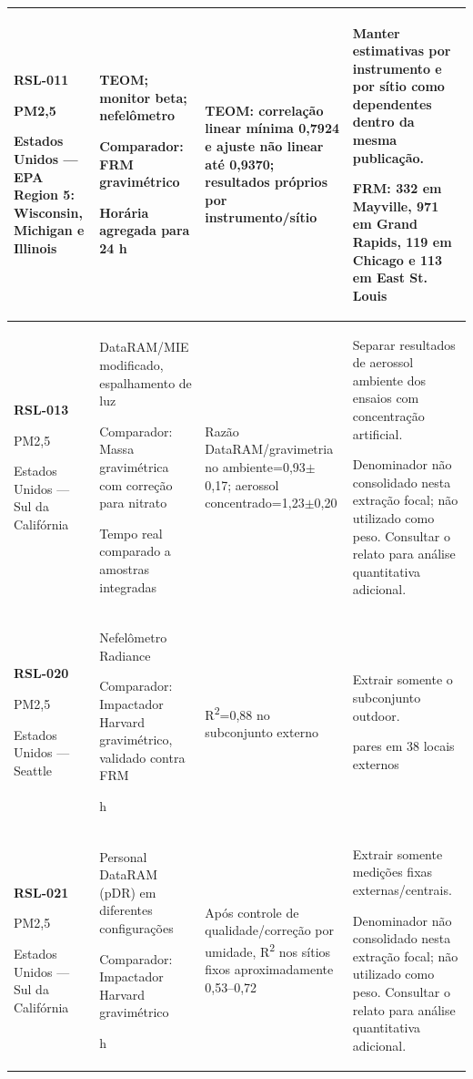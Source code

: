 \begin{longtable}{|P{0.18\textwidth}|P{0.25\textwidth}|P{0.28\textwidth}|P{\arrayrulewidth\relax}|}
\textbf{RSL-011}\par\textcite{rsl011}\par PM2,5\par Estados Unidos --- EPA Region 5: Wisconsin, Michigan e Illinois & TEOM; monitor beta; nefelômetro\par\medskip Comparador: FRM gravimétrico\par\medskip Horária agregada para 24 h & TEOM: correlação linear mínima 0,7924 e ajuste não linear até 0,9370; resultados próprios por instrumento/sítio & Manter estimativas por instrumento e por sítio como dependentes dentro da mesma publicação.\par\medskip FRM: 332 em Mayville, 971 em Grand Rapids, 119 em Chicago e 113 em East St. Louis\\\hline
\textbf{RSL-013}\par\textcite{rsl013}\par PM2,5\par Estados Unidos --- Sul da Califórnia & DataRAM/MIE modificado, espalhamento de luz\par\medskip Comparador: Massa gravimétrica com correção para nitrato\par\medskip Tempo real comparado a amostras integradas & Razão DataRAM/gravimetria no ambiente=0,93\ensuremath{\pm}0,17; aerossol concentrado=1,23\ensuremath{\pm}0,20 & Separar resultados de aerossol ambiente dos ensaios com concentração artificial.\par\medskip Denominador não consolidado nesta extração focal; não utilizado como peso. Consultar o relato para análise quantitativa adicional.\\\hline
\textbf{RSL-020}\par\textcite{rsl020}\par PM2,5\par Estados Unidos --- Seattle & Nefelômetro Radiance\par\medskip Comparador: Impactador Harvard gravimétrico, validado contra FRM\par{} h & R\textsuperscript{2}=0,88 no subconjunto externo & Extrair somente o subconjunto outdoor.\par{} pares em 38 locais externos\\\hline
\textbf{RSL-021}\par\textcite{rsl021}\par PM2,5\par Estados Unidos --- Sul da Califórnia & Personal DataRAM (pDR) em diferentes configurações\par\medskip Comparador: Impactador Harvard gravimétrico\par{} h & Após controle de qualidade/correção por umidade, R\textsuperscript{2} nos sítios fixos aproximadamente 0,53--0,72 & Extrair somente medições fixas externas/centrais.\par\medskip Denominador não consolidado nesta extração focal; não utilizado como peso. Consultar o relato para análise quantitativa adicional.\\\hline

\end{longtable}

